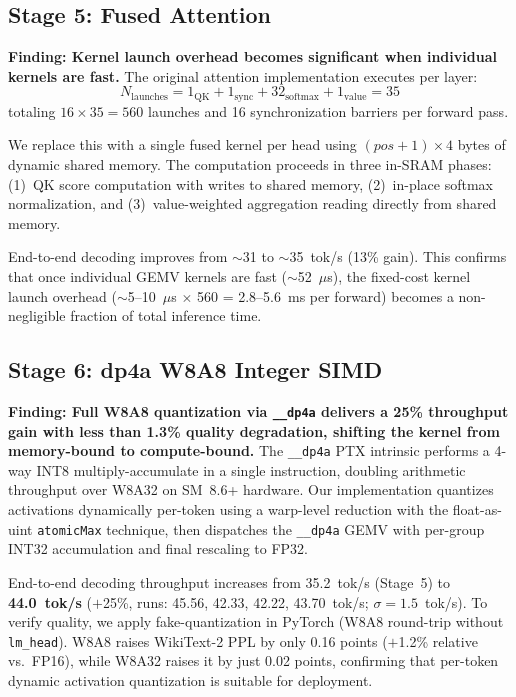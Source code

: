 \documentclass[conference]{IEEEtran}
\begin{document}
\subsection{Stage 5: Fused Attention}

\textbf{Finding: Kernel launch overhead becomes significant when individual kernels are fast.} The original attention implementation executes per layer:
\begin{equation}
    N_{\text{launches}} = 1_{\text{QK}} + 1_{\text{sync}} + 32_{\text{softmax}} + 1_{\text{value}} = 35
\end{equation}
totaling $16 \times 35 = 560$ launches and 16 synchronization barriers per forward pass.

We replace this with a single fused kernel per head using $(pos+1) \times 4$ bytes of dynamic shared memory. The computation proceeds in three in-SRAM phases: (1)~QK score computation with writes to shared memory, (2)~in-place softmax normalization, and (3)~value-weighted aggregation reading directly from shared memory.

End-to-end decoding improves from $\sim$31 to $\sim$35~tok/s (13\% gain). This confirms that once individual GEMV kernels are fast ($\sim$52~$\mu$s), the fixed-cost kernel launch overhead ($\sim$5--10~$\mu$s $\times$ 560 = 2.8--5.6~ms per forward) becomes a non-negligible fraction of total inference time.

\subsection{Stage 6: dp4a W8A8 Integer SIMD}

\textbf{Finding: Full W8A8 quantization via \texttt{\_\_dp4a} delivers a 25\% throughput gain with less than 1.3\% quality degradation, shifting the kernel from memory-bound to compute-bound.}
The \texttt{\_\_dp4a} PTX intrinsic performs a 4-way INT8 multiply-accumulate in a single instruction, doubling arithmetic throughput over W8A32 on SM~8.6+ hardware.
Our implementation quantizes activations dynamically per-token using a warp-level reduction with the float-as-uint \texttt{atomicMax} technique, then dispatches the \texttt{\_\_dp4a} GEMV with per-group INT32 accumulation and final rescaling to FP32.

End-to-end decoding throughput increases from 35.2~tok/s (Stage~5) to \textbf{44.0~tok/s} ($+$25\%, runs: 45.56, 42.33, 42.22, 43.70~tok/s; $\sigma = 1.5$~tok/s).
To verify quality, we apply fake-quantization in PyTorch (W8A8 round-trip without \texttt{lm\_head}).
W8A8 raises WikiText-2 PPL by only 0.16 points ($+$1.2\% relative vs.\ FP16), while W8A32 raises it by just 0.02 points, confirming that per-token dynamic activation quantization is suitable for deployment.
\end{document}
